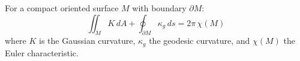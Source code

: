 \documentclass[aspectratio=169]{beamer}
\begin{document}
\begin{wallpaperframe}
For a compact oriented surface \(M\) with boundary \(\partial M\):
\[
\iint_{M} K \, dA + \oint_{\partial M} \kappa_g \, ds = 2\pi\,\chi(M)
\]
where \(K\) is the Gaussian curvature, \(\kappa_g\) the geodesic curvature,
and \(\chi(M)\) the Euler characteristic.
\end{wallpaperframe}
\end{document}
